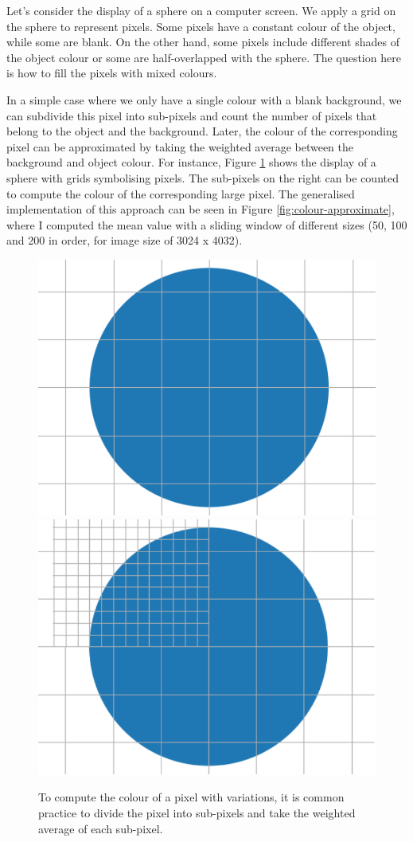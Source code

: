 Let's consider the display of a sphere on a computer screen. We apply a grid on the sphere to represent pixels. Some pixels have a constant colour of the object, while some are blank. On the other hand, some pixels include different shades of the object colour or some are half-overlapped with the sphere. The question here is how to fill the pixels with mixed colours. 

In a simple case where we only have a single colour with a blank background, we can subdivide this pixel into sub-pixels and count the number of pixels that belong to the object and the background. Later, the colour of the corresponding pixel can be approximated by taking the weighted average between the background and object colour. For instance, Figure \ref{fig:display-grid} shows the display of a sphere with grids symbolising pixels. The sub-pixels on the right can be counted to compute the colour of the corresponding large pixel. The generalised implementation of this approach can be seen in Figure \ref{fig:colour-approximate}, where I computed the mean value with a sliding window of different sizes (50, 100 and 200 in order, for image size of 3024 x 4032).

\begin{figure}
  \centering
   \includegraphics[width=0.48\linewidth]{Images/grid_circle.png}
    \includegraphics[width=0.48\linewidth]{Images/merged_grid_circle2-crop.pdf}

   \caption{To compute the colour of a pixel with variations, it is common practice to divide the pixel into sub-pixels and take the weighted average of each sub-pixel.}
   \label{fig:display-grid}
\end{figure}


